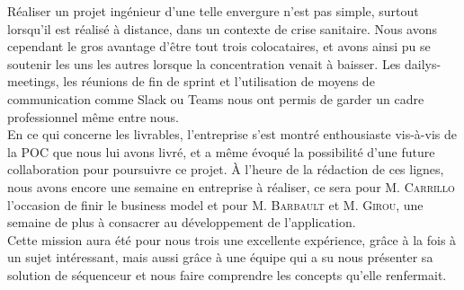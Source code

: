 Réaliser un projet ingénieur d'une telle envergure n'est pas simple, surtout lorsqu'il est réalisé à distance, dans un contexte de crise sanitaire. Nous avons cependant le gros avantage d'être tout trois colocataires, et avons ainsi pu se soutenir les uns les autres lorsque la concentration venait à baisser. Les dailys-meetings, les réunions de fin de sprint et l'utilisation de moyens de communication comme Slack ou Teams nous ont permis de garder un cadre professionnel même entre nous. \\

En ce qui concerne les livrables, l'entreprise s'est montré enthousiaste vis-à-vis de la POC que nous lui avons livré, et a même évoqué la possibilité d'une future collaboration pour poursuivre ce projet. À l'heure de la rédaction de ces lignes, nous avons encore une semaine en entreprise à réaliser, ce sera pour M. \textsc{Carrillo} l'occasion de finir le business model et pour M. \textsc{Barbault} et M. \textsc{Girou}, une semaine de plus à consacrer au développement de l'application.\\

Cette mission aura été pour nous trois une excellente expérience, grâce à la fois à un sujet intéressant, mais aussi grâce à une équipe qui a su nous présenter sa solution de séquenceur et nous faire comprendre les concepts qu'elle renfermait.


